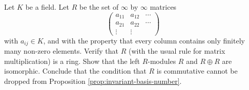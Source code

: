 \begin{exercise}[$\star$]\label{exc:no-well-defined-rank}
Let $K$ be a field. Let $R$ be the set of $\infty$ by $\infty$ matrices 
\[
\left(\begin{array}{ccc}a_{11} & a_{12} & \cdots \\a_{21} & a_{22} & \cdots \\\vdots & \vdots & \end{array}\right)
\]
with $a_{ij} \in K$, and with the property that every column contains only finitely many non-zero elements. Verify that $R$ (with the usual rule for matrix multiplication) is a ring. Show that the left $R$-modules $R$ and $R\oplus R$ are isomorphic. Conclude that the condition that $R$ is commutative cannot be dropped from Proposition \ref{prop:invariant-basis-number}.
\end{exercise}


